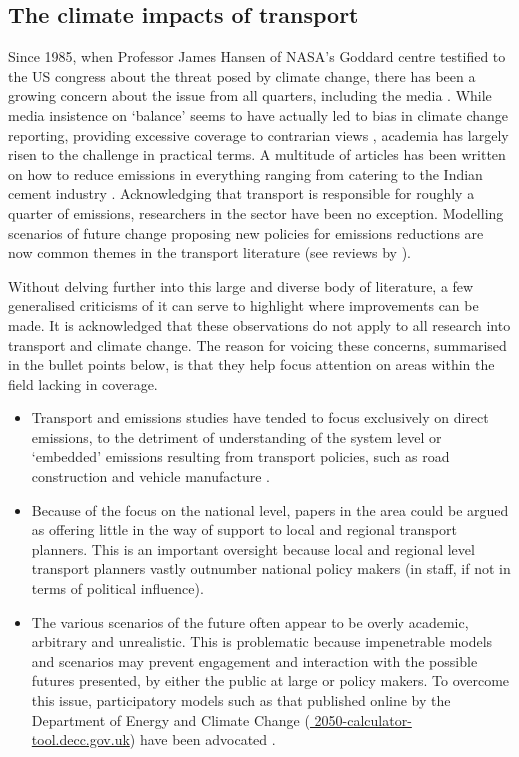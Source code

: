 \documentclass[a4paper, 11pt, twoside]{Thesis}
\begin{document}
\subsection{The climate impacts of transport}
Since 1985, when Professor James Hansen of NASA's Goddard centre testified
to the US congress about the threat posed by climate change, there has
been a growing concern about the issue from all quarters, including the media
\citep{Boykoff2007}. While media insistence on `balance' seems to have actually
led to bias in climate change reporting, providing excessive coverage to contrarian
views \citep{boykoff2004balance}, academia has largely risen to
the challenge in practical terms. A multitude of articles has been written on how to
reduce emissions in everything ranging from catering \citep{gossling2011food}
to the Indian cement industry \citep{kumar2010environmental}.
Acknowledging that transport is responsible for roughly a quarter of emissions,
researchers in the sector have been no exception.
Modelling scenarios of future change proposing new policies
for emissions reductions are now common themes in the transport literature
(see reviews by \citealp{Chapman2007} \citealp{ross2010analysis}).

Without delving further into this large and diverse body of literature,
a few generalised criticisms of it can serve to
highlight where improvements can be made. It is acknowledged that
these observations do not apply to all research into
transport and climate change. The reason for voicing these concerns,
summarised in the bullet points below, is that they
help focus attention on areas within the field lacking in
coverage.
\begin{itemize}
 \item Transport and emissions studies have tended to focus exclusively on
 direct emissions, to the detriment of understanding of the system level or
 `embedded' emissions resulting from transport policies,
 such as road construction and vehicle
 manufacture \citep{Lenzen1999, Wee2005}.
 \item Because of the focus on the national level, papers in the area
 could be argued as offering little in the way of support to local and regional transport
 planners. This is an important oversight because local and regional level
 transport planners vastly outnumber national policy makers (in staff, if not
 in terms of political influence).
 \item The various scenarios of the future often appear to be overly academic,
 arbitrary and unrealistic. This is
 problematic because impenetrable models and scenarios
 may prevent engagement and interaction with the
 possible futures presented, by either the public at large or policy makers.
 To overcome this issue, participatory models
 such as that published online by the Department of Energy and Climate Change
 (\href{http://2050-calculator-tool.decc.gov.uk/pathways/11111111111111111111111111111111111111111111111111111/primary_energy_chart}
 {\color{blue} 2050-calculator-tool.decc.gov.uk}) have been advocated
 \citep{fulton2012exploring}.
\end{itemize}
\end{document}
